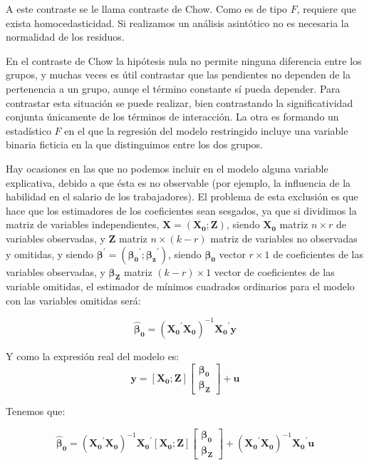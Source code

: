 A este contraste se le llama contraste de Chow. Como es de tipo $F$, requiere que exista homocedasticidad. Si realizamos un an\'alisis asint\'otico no es necesaria la normalidad de los residuos.

En el contraste de Chow la hip\'otesis nula no permite ninguna diferencia entre los grupos, y muchas veces es \'util contrastar que las pendientes no dependen de la pertenencia a un grupo, aunqe el t\'ermino constante s\'i pueda depender. Para contrastar esta situaci\'on se puede realizar, bien contrastando la significatividad conjunta \'unicamente de los t\'erminos de interacci\'on. La otra es formando un estad\'istico $F$ en el que la regresi\'on del modelo restringido incluye una variable binaria ficticia en la que distinguimos entre los dos grupos.


Hay ocasiones en las que no podemos incluir en el modelo alguna variable explicativa, debido a que \'esta es no observable (por ejemplo, la influencia de la habilidad en el salario de los trabajadores). El problema de esta exclusi\'on es que hace que los estimadores de los coeficientes sean sesgados, ya que si dividimos la matriz de variables independientes, $\boldsymbol{X}=\left(\boldsymbol{X_0};\boldsymbol{Z}\right)$, siendo $\boldsymbol{X_0}$ matriz $n\times r$ de variables observadas, y $\boldsymbol{Z}$ matriz $n\times(k-r)$ matriz de variables no observadas y omitidas, y siendo $\boldsymbol{\beta}^{\prime}=\left(\boldsymbol{\beta_0}^{\prime};\boldsymbol{\beta_z}^{\prime}\right)$, siendo $\boldsymbol{\beta_0}$ vector $r\times 1$ de coeficientes de las variables observadas, y $\boldsymbol{\beta_Z}$ matriz $(k-r)\times 1$ vector de coeficientes de las variable omitidas, el estimador de m\'inimos cuadrados ordinarios para el modelo con las variables omitidas ser\'a:

\[\hat{\boldsymbol{\beta}}_{\boldsymbol{0}}=\left(\boldsymbol{X_0}^{\prime}\boldsymbol{X_0}\right)^{-1}\boldsymbol{X_0}^{\prime}\boldsymbol{y}\] 

Y como la expresi\'on real del modelo es: 
\[\boldsymbol{y}=\left[\boldsymbol{X_0}; \boldsymbol{Z}\right]\left[\begin{matrix}
\boldsymbol{\beta_0} \\
\boldsymbol{\beta_Z}
\end{matrix}\right]+\boldsymbol{u} \]

Tenemos que:

\[\hat{\boldsymbol{\beta}}_{\boldsymbol{0}}=\left(\boldsymbol{X_0}^{\prime}\boldsymbol{X_0}\right)^{-1}\boldsymbol{X_0}^{\prime}\left[\boldsymbol{X_0}; \boldsymbol{Z}\right]\left[\begin{matrix}
\boldsymbol{\beta_0} \\
\boldsymbol{\beta_Z}
\end{matrix}\right]+\left(\boldsymbol{X_0}^{\prime}\boldsymbol{X_0}\right)^{-1}\boldsymbol{X_0}^{\prime}\boldsymbol{u}\]


